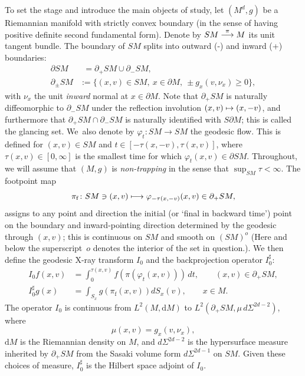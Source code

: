 \documentclass[11pt]{article}
\def\mto{\mathchoice{\longmapsto}{\mapsto}{\mapsto}{\mapsto}}
\def\To#1{\mathchoice{\xrightarrow{\textstyle\kern4pt#1\kern3pt}}{\stackrel{#1}{\longrightarrow}}{}{}}
\theoremstyle{plain}
\theoremstyle{definition}
\theoremstyle{remark}
\newcommand{\adj}{I_0^\sharp}
\newcommand {\dM}{\mathrm{d}M}
\newcommand{\foot}{{\pi_{\mathrm f}}}
\begin{document}
To set the stage and introduce the main objects of study, let $(M^d,g)$ be a Riemannian manifold with strictly convex boundary (in the sense of
having positive definite second fundamental form). Denote by $SM\To{\pi} M$ its unit tangent bundle. The boundary of
$SM$ splits into outward (-) and inward (+) boundaries:
\begin{equation}
\begin{aligned}
\partial SM &\phantom{:}= \partial_+ SM \cup \partial_- SM, \\
\partial_\pm SM &:= \{ (x,v)\in SM,\ x\in \partial M,\ \pm g_x(v,\nu_x)\ge 0 \},
\label{eq:dSM}
\end{aligned}
\end{equation}
with $\nu_x$ the unit {\it inward} normal at $x\in \partial M$. Note that $\partial_+ SM$ is naturally diffeomorphic to
$\partial_- SM$ under the reflection involution $(x,v)\mto (x,-v)$, and furthermore that $\partial_+ SM \cap \partial_-SM$ is naturally identified
with $S\partial M$; this is called the glancing set. We~also denote by $\varphi_t \colon SM\to SM$ the geodesic flow. This is
defined for $(x,v)\in SM$ and $t\in [-\tau(x,-v),\tau(x,v)]$, where $\tau(x,v) \in [0,\infty]$ is the smallest time for which
$\varphi_t(x,v) \in \partial SM$. Throughout, we will assume that $(M,g)$ is {\em non-trapping} in the sense that
$\sup_{SM} \tau <\infty$. The footpoint map
\begin{equation*}%
\foot\colon SM\ni (x,v) \mto \varphi_{-\tau(x,-v)} (x,v) \in \partial_+ SM,
\end{equation*}
assigns to any point and direction the initial (or `final in backward time') point on the boundary and inward-pointing direction determined by the geodesic through $(x,v)$;
this is continuous on $SM$ and smooth on $(SM)^{o}$ (Here and below the superscript~$o$ deno\-tes the interior of the set in question.). We then define the geodesic X-ray transform $I_0$ and the backprojection operator $\adj$:
\begin{align}
I_0 f (x,v) &= \int_0^{\tau(x,v)} f(\pi (\varphi_t(x,v)))\,dt, \qquad (x,v) \in \partial_+ SM, \label{eq:forward} \\
\adj g (x) &= \int_{S_x} g(\foot (x,v)) dS_x(v), \qquad x \in M. \label{eq:adjoint}
\end{align}
The operator $I_0$ is continuous from $L^2(M, \dM)$ to $L^2(\partial_+ SM, \mu\, d\Sigma^{2d-2})$, where
\[
\mu(x,v) = g_x(v,\nu_x),
\]
$\dM$ is the Riemannian density on $M$, and $d\Sigma^{2d-2}$ is the hypersurface measure inher\-ited by $\partial_+ SM$ from the Sasaki volume form $d\Sigma^{2d-1}$ on $SM$. Given these choices of measure, $\adj $ is the Hilbert space adjoint of $I_0$.
\end{document}
